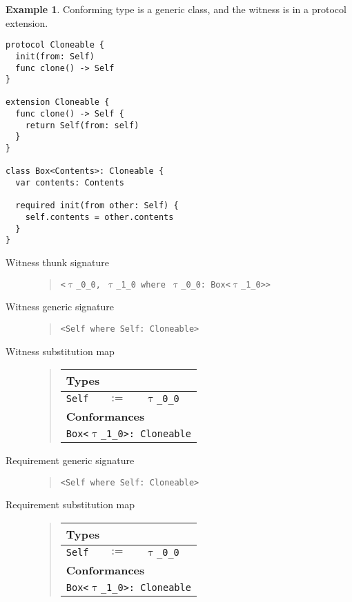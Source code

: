 \documentclass[a4paper,headsepline,bibliography=totoc,toc=flat,fleqn,twoside=semi]{scrbook}
\theoremstyle{definition}
\theoremstyle{definition}
\newtheorem{example}{Example}[chapter]
\theoremstyle{definition}
\newcommand{\ttgp}[2]{\texttt{$\uptau$\_#1\_#2}}
\newcommand{\SubMapC}[2]{\begin{tabular}{|lll|}
\hline
\multicolumn{3}{|l|}{\textbf{Types}}\\
\hline
#1\\
\hline
\hline
\multicolumn{3}{|l|}{\textbf{Conformances}}\\
\hline
#2\\
\hline
\end{tabular}}
\newcommand{\SubType}[2]{\texttt{#1}&$:=$&\texttt{#2}}
\newcommand{\SubConf}[1]{\multicolumn{3}{|l|}{\texttt{#1}}}
\begin{document}
\begin{example} Conforming type is a generic class, and the witness is in a protocol extension.
\begin{Verbatim}
protocol Cloneable {
  init(from: Self)
  func clone() -> Self
}

extension Cloneable {
  func clone() -> Self {
    return Self(from: self)
  }
}

class Box<Contents>: Cloneable {
  var contents: Contents

  required init(from other: Self) {
    self.contents = other.contents
  }
}
\end{Verbatim}
\begin{description}
\item[Witness thunk signature]  \vphantom{a}
\begin{quote}
\texttt{<\ttgp{0}{0}, \ttgp{1}{0} where \ttgp{0}{0}:\ Box<\ttgp{1}{0}>>}
\end{quote}
\item[Witness generic signature]  \vphantom{a}
\begin{quote}
\texttt{<Self where Self:\ Cloneable>}
\end{quote}
\item[Witness substitution map] \vphantom{a}
\begin{quote}
\SubMapC{
\SubType{Self}{\ttgp{0}{0}}
}{
\SubConf{Box<\ttgp{1}{0}>:\ Cloneable}
}
\end{quote}

\item[Requirement generic signature]  \vphantom{a}
\begin{quote}
\texttt{<Self where Self:\ Cloneable>}
\end{quote}
\item[Requirement substitution map] \phantom{a}
\begin{quote}
\SubMapC{
\SubType{Self}{\ttgp{0}{0}}
}{
\SubConf{Box<\ttgp{1}{0}>:\ Cloneable}
}
\end{quote}
\end{description}
\end{example}

\vfill
\eject
\end{document}
